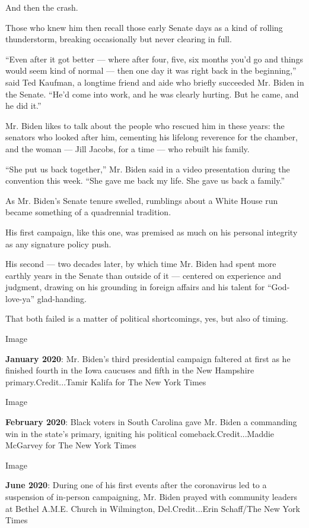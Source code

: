 And then the crash.

Those who knew him then recall those early Senate days as a kind of
rolling thunderstorm, breaking occasionally but never clearing in full.

``Even after it got better --- where after four, five, six months you'd
go and things would seem kind of normal --- then one day it was right
back in the beginning,'' said Ted Kaufman, a longtime friend and aide
who briefly succeeded Mr. Biden in the Senate. ``He'd come into work,
and he was clearly hurting. But he came, and he did it.''

Mr. Biden likes to talk about the people who rescued him in these years:
the senators who looked after him, cementing his lifelong reverence for
the chamber, and the woman --- Jill Jacobs, for a time --- who rebuilt
his family.

``She put us back together,'' Mr. Biden said in a video presentation
during the convention this week. ``She gave me back my life. She gave us
back a family.''

As Mr. Biden's Senate tenure swelled, rumblings about a White House run
became something of a quadrennial tradition.

His first campaign, like this one, was premised as much on his personal
integrity as any signature policy push.

His second --- two decades later, by which time Mr. Biden had spent more
earthly years in the Senate than outside of it --- centered on
experience and judgment, drawing on his grounding in foreign affairs and
his talent for ``God-love-ya'' glad-handing.

That both failed is a matter of political shortcomings, yes, but also of
timing.

Image

\textbf{January 2020}: Mr. Biden's third presidential campaign faltered
at first as he finished fourth in the Iowa caucuses and fifth in the New
Hampshire primary.Credit...Tamir Kalifa for The New York Times

Image

\textbf{February 2020}: Black voters in South Carolina gave Mr. Biden a
commanding win in the state's primary, igniting his political
comeback.Credit...Maddie McGarvey for The New York Times

Image

\textbf{June 2020}: During one of his first events after the coronavirus
led to a suspension of in-person campaigning, Mr. Biden prayed with
community leaders at Bethel A.M.E. Church in Wilmington,
Del.Credit...Erin Schaff/The New York Times

